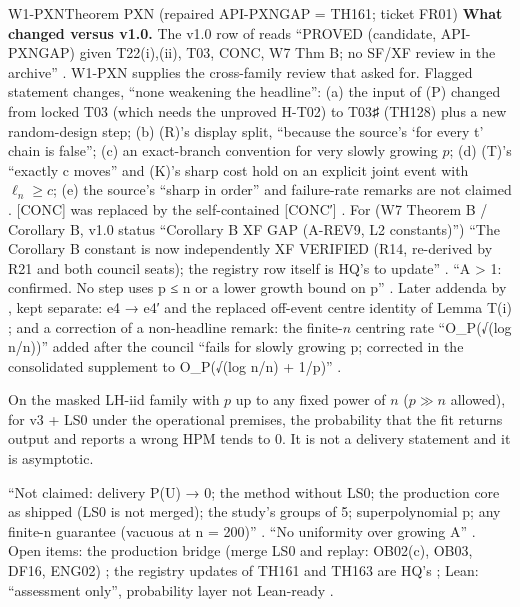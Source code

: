 \begin{card}{W1-PXN}{Theorem PXN (repaired API-PXNGAP = TH161; ticket FR01)}
\textbf{What changed versus v1.0.} The v1.0 row of  reads ``PROVED (candidate, API-PXNGAP) given T22(i),(ii), T03, CONC, W7 Thm B; no SF/XF review in the archive'' . W1-PXN supplies the cross-family review that  asked for. Flagged statement changes, ``none weakening the headline'': (a) the input of (P) changed from locked T03 (which needs the unproved H-T02) to T03♯ (TH128) plus a new random-design step; (b) (R)'s display split, ``because the source's `for every t' chain is false''; (c) an exact-branch convention for very slowly growing $p$; (d) (T)'s ``exactly c moves'' and (K)'s sharp cost hold on an explicit joint event with $\ell_n\ge c$; (e) the source's ``sharp in order'' and failure-rate remarks are not claimed . [CONC] was replaced by the self-contained [CONC′] . For  (W7 Theorem B / Corollary B, v1.0 status ``Corollary B XF GAP (A-REV9, L2 constants)'') ``The Corollary B constant is now independently XF VERIFIED (R14, re-derived by R21 and both council seats); the registry row itself is HQ's to update'' . ``A > 1: confirmed. No step uses p ≤ n or a lower growth bound on p'' . Later addenda by , kept separate: e4 → e4′ and the replaced off-event centre identity of Lemma T(i) ; and a correction of a non-headline remark: the finite-$n$ centring rate ``O\_P(√(log n/n))'' added after the council ``fails for slowly growing p; corrected in the consolidated supplement to O\_P(√(log n/n) + 1/p)'' .

\begin{plain}On the masked LH-iid family with $p$ up to any fixed power of $n$ ($p\gg n$ allowed), for v3 + LS0 under the operational premises, the probability that the fit returns output and reports a wrong HPM tends to 0. It is not a delivery statement and it is asymptotic.\end{plain}
\begin{notproved}
``Not claimed: delivery P(U) → 0; the method without LS0; the production core as shipped (LS0 is not merged); the study's groups of 5; superpolynomial p; any finite-n guarantee (vacuous at n = 200)'' . ``No uniformity over growing A'' . Open items: the production bridge (merge LS0 and replay: OB02(c), OB03, DF16, ENG02) ; the registry updates of TH161 and TH163 are HQ's ; Lean: ``assessment only'', probability layer not Lean-ready .
\end{notproved}
\end{card}

